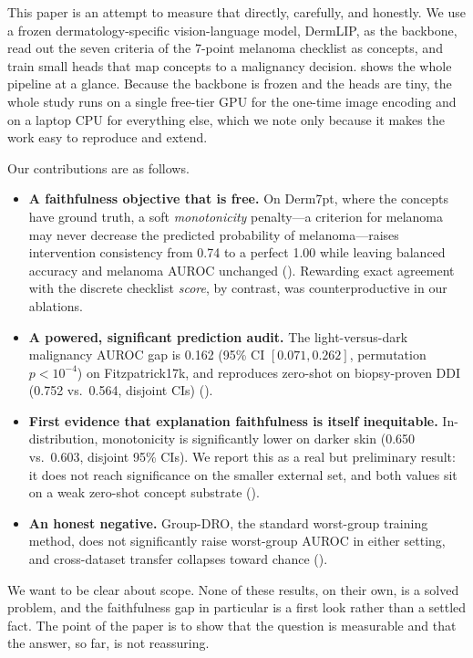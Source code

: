 \documentclass[pmlr,twocolumn,10pt]{jmlr}
\begin{document}
This paper is an attempt to measure that directly, carefully, and honestly. We
use a frozen dermatology-specific vision-language model, DermLIP, as the
backbone, read out the seven criteria of the 7-point melanoma checklist
\citep{argenziano1998epiluminescence} as concepts, and train small heads that
map concepts to a malignancy decision.  shows the whole
pipeline at a glance. Because the backbone is frozen and the
heads are tiny, the whole study runs on a single free-tier GPU for the one-time
image encoding and on a laptop CPU for everything else, which we note only
because it makes the work easy to reproduce and extend.

Our contributions are as follows.
\begin{itemize}
  \item \textbf{A faithfulness objective that is free.} On Derm7pt, where the
  concepts have ground truth, a soft \emph{monotonicity} penalty---a criterion
  for melanoma may never decrease the predicted probability of
  melanoma---raises intervention consistency from 0.74 to a perfect 1.00 while
  leaving balanced accuracy and melanoma AUROC unchanged
  (). Rewarding exact agreement with the discrete checklist
  \emph{score}, by contrast, was counterproductive in our ablations.
  \item \textbf{A powered, significant prediction audit.} The light-versus-dark
  malignancy AUROC gap is 0.162 (95\% CI $[0.071, 0.262]$, permutation
  $p<10^{-4}$) on Fitzpatrick17k, and reproduces zero-shot on biopsy-proven DDI
  (0.752 vs.\ 0.564, disjoint CIs) ().
  \item \textbf{First evidence that explanation faithfulness is itself
  inequitable.} In-distribution, monotonicity is significantly lower on darker
  skin (0.650 vs.\ 0.603, disjoint 95\% CIs). We report this as a real but
  preliminary result: it does not reach significance on the smaller external
  set, and both values sit on a weak zero-shot concept substrate
  ().
  \item \textbf{An honest negative.} Group-DRO, the standard worst-group
  training method, does not significantly raise worst-group AUROC in either
  setting, and cross-dataset transfer collapses toward chance
  ().
\end{itemize}

We want to be clear about scope. None of these results, on their own, is a
solved problem, and the faithfulness gap in particular is a first look rather
than a settled fact. The point of the paper is to show that the question is
measurable and that the answer, so far, is not reassuring.
\end{document}
